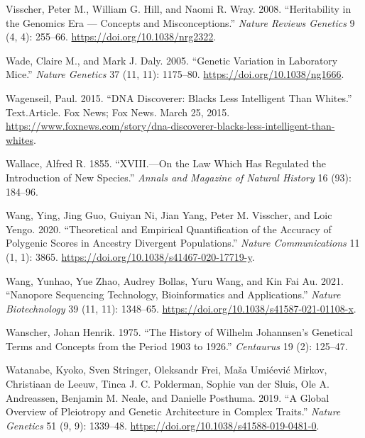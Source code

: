 \documentclass[
]{book}
\newlength{\cslhangindent}
\newlength{\cslentryspacingunit} %
\newenvironment{CSLReferences}[2] %
 {%
  \setlength{\parindent}{0pt}
  \ifodd #1
  \let\oldpar\par
  \def\par{\hangindent=\cslhangindent\oldpar}
  \fi
  \setlength{\parskip}{#2\cslentryspacingunit}
 }%
 {}
\begin{document}
\begin{CSLReferences}{1}{0}
\leavevmode{}%
Visscher, Peter M., William G. Hill, and Naomi R. Wray. 2008. {``Heritability in the Genomics Era --- Concepts and Misconceptions.''} \emph{Nature Reviews Genetics} 9 (4, 4): 255--66. \url{https://doi.org/10.1038/nrg2322}.

\leavevmode{}%
Wade, Claire M., and Mark J. Daly. 2005. {``Genetic Variation in Laboratory Mice.''} \emph{Nature Genetics} 37 (11, 11): 1175--80. \url{https://doi.org/10.1038/ng1666}.

\leavevmode{}%
Wagenseil, Paul. 2015. {``{DNA Discoverer}: {Blacks Less Intelligent Than Whites}.''} Text.Article. {Fox News}; {Fox News}. March 25, 2015. \url{https://www.foxnews.com/story/dna-discoverer-blacks-less-intelligent-than-whites}.

\leavevmode{}%
Wallace, Alfred R. 1855. {``{XVIII}.---{On} the Law Which Has Regulated the Introduction of New Species.''} \emph{Annals and Magazine of Natural History} 16 (93): 184--96.

\leavevmode{}%
Wang, Ying, Jing Guo, Guiyan Ni, Jian Yang, Peter M. Visscher, and Loic Yengo. 2020. {``Theoretical and Empirical Quantification of the Accuracy of Polygenic Scores in Ancestry Divergent Populations.''} \emph{Nature Communications} 11 (1, 1): 3865. \url{https://doi.org/10.1038/s41467-020-17719-y}.

\leavevmode{}%
Wang, Yunhao, Yue Zhao, Audrey Bollas, Yuru Wang, and Kin Fai Au. 2021. {``Nanopore Sequencing Technology, Bioinformatics and Applications.''} \emph{Nature Biotechnology} 39 (11, 11): 1348--65. \url{https://doi.org/10.1038/s41587-021-01108-x}.

\leavevmode{}%
Wanscher, Johan Henrik. 1975. {``The History of {Wilhelm Johannsen}'s Genetical Terms and Concepts from the Period 1903 to 1926.''} \emph{Centaurus} 19 (2): 125--47.

\leavevmode{}%
Watanabe, Kyoko, Sven Stringer, Oleksandr Frei, Maša Umićević Mirkov, Christiaan de Leeuw, Tinca J. C. Polderman, Sophie van der Sluis, Ole A. Andreassen, Benjamin M. Neale, and Danielle Posthuma. 2019. {``A Global Overview of Pleiotropy and Genetic Architecture in Complex Traits.''} \emph{Nature Genetics} 51 (9, 9): 1339--48. \url{https://doi.org/10.1038/s41588-019-0481-0}.


\end{CSLReferences}
\end{document}
